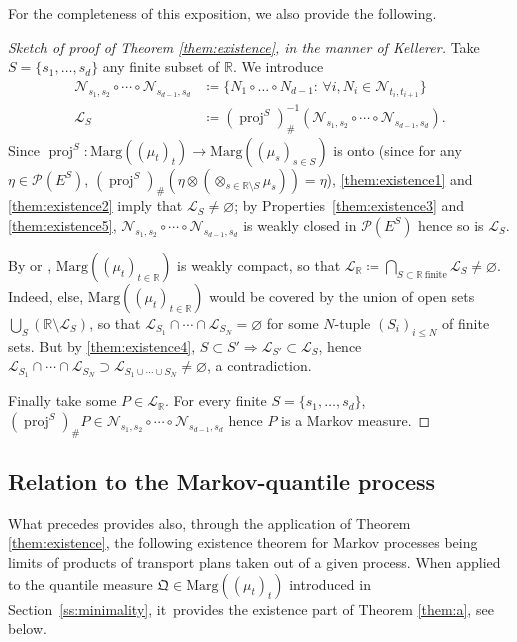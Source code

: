 \documentclass[11pt]{article}
\theoremstyle{plain}
\theoremstyle{definition}
\newcommand{\como}{\mathfrak{Q}}
\newcommand{\eqdef}{\coloneqq}
\newcommand{\eqdefup}{\coloneqq}
\newcommand{\p}{\mathcal{P}}
\newcommand{\ma}{\mathrm{Marg}}
\newcommand{\R}{\mathbb{R}}
\newcommand{\pr}{\operatorname{proj}}
\begin{document}
For the completeness of this exposition, we also provide the following.

\begin{proof}[Sketch of proof of Theorem \ref{them:existence}, in the manner of Kellerer]\label{proof:them:existence} Take $S=\{s_1,\ldots,s_d\}$ any finite subset of $\R$. We introduce
\begin{align*}
\mathcal{N}_{s_1,s_2}\circ\cdots\circ\mathcal{N}_{s_{d-1},s_d}&\eqdef\{N_1\circ\ldots\circ N_{d-1}:\,\forall i, N_i\in\mathcal{N}_{t_i,t_{i+1}}\}\\
\tag*{and}
\mathcal{L}_S&\eqdefup(\pr^S)_\#^{-1}(\mathcal{N}_{s_1,s_2}\circ\cdots\circ\mathcal{N}_{s_{d-1},s_d}).
\end{align*}
Since $\pr^S:\ma((\mu_t)_t)\to\ma((\mu_s)_{s\in S})$ is onto (since for any $\eta\in\p(E^S)$, $(\pr^S)_\#(\eta\otimes(\otimes_{s\in \R\setminus S}\mu_s))=\eta$), \eqref{them:existence1} and \eqref{them:existence2} imply that $\mathcal{L}_S\neq\varnothing$; by Properties~\eqref{them:existence3} and \eqref{them:existence5}, $\mathcal{N}_{s_1,s_2}\circ\cdots\circ\mathcal{N}_{s_{d-1},s_d}$ is weakly closed in $\p(E^S)$ hence so is $\mathcal{L}_S$.

By \cite[\S 1.2]{Ke72} or \cite[\S 2]{BHS}, $\ma((\mu_t)_{t\in \R})$ is weakly compact, so that $\mathcal{L}_\R\eqdef\bigcap_{S\subset \R\ \text{finite}}\mathcal{L}_S\neq\varnothing$. Indeed, else, $\ma((\mu_t)_{t\in \R})$ would be covered by the union of open sets $\bigcup_S(\R\setminus\mathcal{L}_S)$, so that $\mathcal{L}_{S_1}\cap\cdots \cap \mathcal{L}_{S_N}=\varnothing$ for some $N$-tuple $(S_i)_{i\leq N}$ of finite sets. But by \eqref{them:existence4}, $S\subset S'\Rightarrow \mathcal{L}_{S'}\subset \mathcal{L}_{S}$, hence $\mathcal{L}_{S_1}\cap\cdots \cap \mathcal{L}_{S_N}\supset\mathcal{L}_{S_1\cup\cdots\cup S_N}\neq\varnothing$, a contradiction.

Finally take some $P\in\mathcal{L}_\R$. For every finite $S=\{s_1,\ldots,s_d\}$, $(\pr^S)_\#P\in\mathcal{N}_{s_1,s_2}\circ\cdots\circ\mathcal{N}_{s_{d-1},s_d}$ hence $P$ is a Markov measure.
\end{proof}

\subsection{Relation to the Markov-quantile process}\label{subsec:markovinification}

What precedes provides also, through the application of Theorem \ref{them:existence}, the following existence theorem for Markov processes being limits of products of transport plans taken out of a given process. When applied to the quantile measure $\como\in\ma((\mu_t)_t)$ introduced in Section~\ref{ss:minimality}, it~provides the existence part of Theorem \ref{them:a}, see below.
\end{document}
